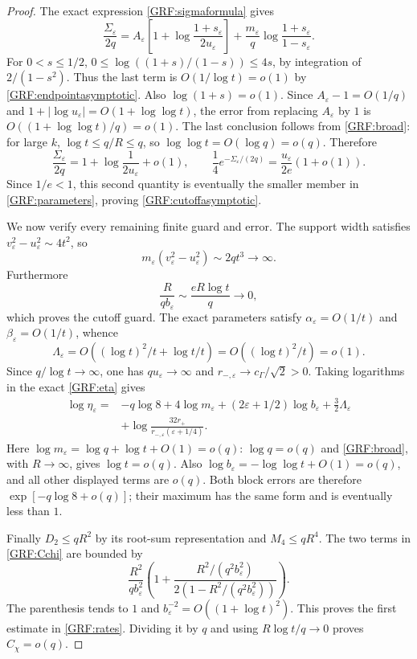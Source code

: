 \documentclass[11pt,a4paper]{article}
\begin{document}
\begin{proof}
The exact expression \eqref{GRF:sigmaformula} gives
\begin{equation*}\tag{GRF27}\label{GRF:sigmashifted}
 \frac{\Sigma_\varepsilon}{2q}
 =A_\varepsilon\left[1+
          \log\frac{1+s_\varepsilon}{2u_\varepsilon}\right]
 +\frac{m_\varepsilon}{q}
          \log\frac{1+s_\varepsilon}{1-s_\varepsilon}.
\end{equation*}
For $0<s\le1/2$,
$0\le\log((1+s)/(1-s))\le4s$, by integration of $2/(1-s^2)$.
Thus the last term is $O(1/\log t)=o(1)$ by
\eqref{GRF:endpointasymptotic}. Also $\log(1+s)=o(1)$.
Since $A_\varepsilon-1=O(1/q)$ and
$1+|\log u_\varepsilon|=O(1+\log\log t)$, the error from replacing
$A_\varepsilon$ by $1$ is $O((1+\log\log t)/q)=o(1)$.
The last conclusion follows from \eqref{GRF:broad}: for large $k$,
$\log t\le q/R\le q$, so $\log\log t=O(\log q)=o(q)$.
Therefore
\[
 \frac{\Sigma_\varepsilon}{2q}
 =1+\log\frac1{2u_\varepsilon}+o(1),\qquad
 \frac14e^{-\Sigma_\varepsilon/(2q)}
 =\frac{u_\varepsilon}{2e}(1+o(1)).
\]
Since $1/e<1$, this second quantity is eventually the smaller member
in \eqref{GRF:parameters}, proving \eqref{GRF:cutoffasymptotic}.

We now verify every remaining finite guard and error. The support width
satisfies $v_\varepsilon^2-u_\varepsilon^2\sim4t^2$, so
\[
 m_\varepsilon(v_\varepsilon^2-u_\varepsilon^2)
 \sim2qt^3\longrightarrow\infty.
\]
Furthermore
\[
 \frac{R}{qb_\varepsilon}\sim\frac{eR\log t}{q}
 \longrightarrow0,
\]
which proves the cutoff guard. The exact parameters satisfy
$\alpha_\varepsilon=O(1/t)$ and $\beta_\varepsilon=O(1/t)$, whence
\[
 \Lambda_\varepsilon=O((\log t)^2/t+\log t/t)
 =O((\log t)^2/t)=o(1).
\]
Since $q/\log t\to\infty$, one has
$qu_\varepsilon\to\infty$ and
$r_{-,\varepsilon}\to c_\Gamma/\sqrt2>0$.
Taking logarithms in the exact \eqref{GRF:eta} gives
\begin{align*}
 \log\eta_\varepsilon
 ={}&-q\log8+4\log m_\varepsilon
 +(2\varepsilon+1/2)\log b_\varepsilon
 +\frac32\Lambda_\varepsilon\\
 &+\log\frac{32r_+}{r_{-,\varepsilon}(\varepsilon+1/4)}.
\end{align*}
Here $\log m_\varepsilon=\log q+\log t+O(1)=o(q)$:
$\log q=o(q)$ and \eqref{GRF:broad}, with $R\to\infty$, gives
$\log t=o(q)$. Also
$\log b_\varepsilon=-\log\log t+O(1)=o(q)$, and all other displayed
terms are $o(q)$. Both block errors are therefore
$\exp[-q\log8+o(q)]$; their maximum has the same form and is eventually
less than $1$.

Finally $D_2\le qR^2$ by its root-sum representation and
$M_4\le qR^4$. The two terms in \eqref{GRF:Cchi} are bounded by
\[
 \frac{R^2}{qb_\varepsilon^2}
 \left(1+
 \frac{R^2/(q^2b_\varepsilon^2)}
      {2(1-R^2/(q^2b_\varepsilon^2))}\right).
\]
The parenthesis tends to $1$ and
$b_\varepsilon^{-2}=O((1+\log t)^2)$.
This proves the first estimate in \eqref{GRF:rates}. Dividing it by $q$
and using $R\log t/q\to0$ proves $C_\chi=o(q)$.
\end{proof}
\end{document}
